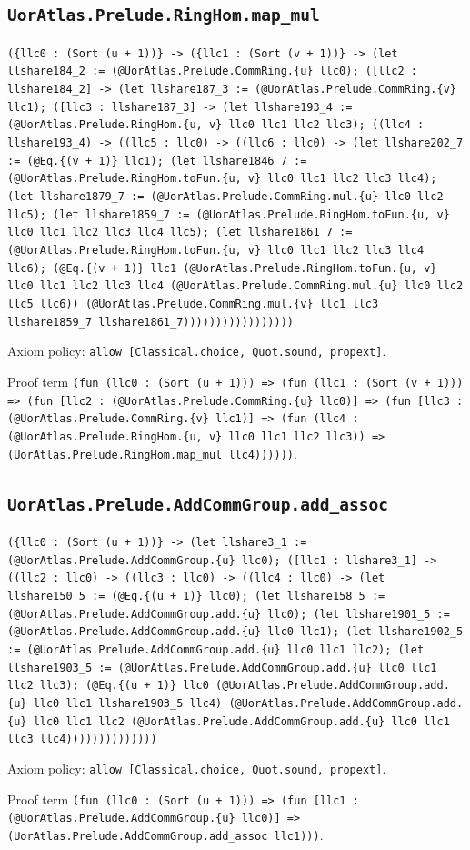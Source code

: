 \documentclass[11pt]{article}
\begin{document}
\subsection*{\texttt{UorAtlas.Prelude.RingHom.map\_mul}}
\noindent\texttt{(\{llc0 : (Sort (u + 1))\} -> (\{llc1 : (Sort (v + 1))\} -> (let llshare184\_2 := (@UorAtlas.Prelude.CommRing.\{u\} llc0); ([llc2 : llshare184\_2] -> (let llshare187\_3 := (@UorAtlas.Prelude.CommRing.\{v\} llc1); ([llc3 : llshare187\_3] -> (let llshare193\_4 := (@UorAtlas.Prelude.RingHom.\{u, v\} llc0 llc1 llc2 llc3); ((llc4 : llshare193\_4) -> ((llc5 : llc0) -> ((llc6 : llc0) -> (let llshare202\_7 := (@Eq.\{(v + 1)\} llc1); (let llshare1846\_7 := (@UorAtlas.Prelude.RingHom.toFun.\{u, v\} llc0 llc1 llc2 llc3 llc4); (let llshare1879\_7 := (@UorAtlas.Prelude.CommRing.mul.\{u\} llc0 llc2 llc5); (let llshare1859\_7 := (@UorAtlas.Prelude.RingHom.toFun.\{u, v\} llc0 llc1 llc2 llc3 llc4 llc5); (let llshare1861\_7 := (@UorAtlas.Prelude.RingHom.toFun.\{u, v\} llc0 llc1 llc2 llc3 llc4 llc6); (@Eq.\{(v + 1)\} llc1 (@UorAtlas.Prelude.RingHom.toFun.\{u, v\} llc0 llc1 llc2 llc3 llc4 (@UorAtlas.Prelude.CommRing.mul.\{u\} llc0 llc2 llc5 llc6)) (@UorAtlas.Prelude.CommRing.mul.\{v\} llc1 llc3 llshare1859\_7 llshare1861\_7)))))))))))))))))}\par
\noindent Axiom policy: \texttt{allow [Classical.choice, Quot.sound, propext]}.\par
\noindent Proof term \texttt{(fun (llc0 : (Sort (u + 1))) => (fun (llc1 : (Sort (v + 1))) => (fun [llc2 : (@UorAtlas.Prelude.CommRing.\{u\} llc0)] => (fun [llc3 : (@UorAtlas.Prelude.CommRing.\{v\} llc1)] => (fun (llc4 : (@UorAtlas.Prelude.RingHom.\{u, v\} llc0 llc1 llc2 llc3)) => (UorAtlas.Prelude.RingHom.map\_mul llc4))))))}.\par
\subsection*{\texttt{UorAtlas.Prelude.AddCommGroup.add\_assoc}}
\noindent\texttt{(\{llc0 : (Sort (u + 1))\} -> (let llshare3\_1 := (@UorAtlas.Prelude.AddCommGroup.\{u\} llc0); ([llc1 : llshare3\_1] -> ((llc2 : llc0) -> ((llc3 : llc0) -> ((llc4 : llc0) -> (let llshare150\_5 := (@Eq.\{(u + 1)\} llc0); (let llshare158\_5 := (@UorAtlas.Prelude.AddCommGroup.add.\{u\} llc0); (let llshare1901\_5 := (@UorAtlas.Prelude.AddCommGroup.add.\{u\} llc0 llc1); (let llshare1902\_5 := (@UorAtlas.Prelude.AddCommGroup.add.\{u\} llc0 llc1 llc2); (let llshare1903\_5 := (@UorAtlas.Prelude.AddCommGroup.add.\{u\} llc0 llc1 llc2 llc3); (@Eq.\{(u + 1)\} llc0 (@UorAtlas.Prelude.AddCommGroup.add.\{u\} llc0 llc1 llshare1903\_5 llc4) (@UorAtlas.Prelude.AddCommGroup.add.\{u\} llc0 llc1 llc2 (@UorAtlas.Prelude.AddCommGroup.add.\{u\} llc0 llc1 llc3 llc4))))))))))))))}\par
\noindent Axiom policy: \texttt{allow [Classical.choice, Quot.sound, propext]}.\par
\noindent Proof term \texttt{(fun (llc0 : (Sort (u + 1))) => (fun [llc1 : (@UorAtlas.Prelude.AddCommGroup.\{u\} llc0)] => (UorAtlas.Prelude.AddCommGroup.add\_assoc llc1)))}.\par
\end{document}
